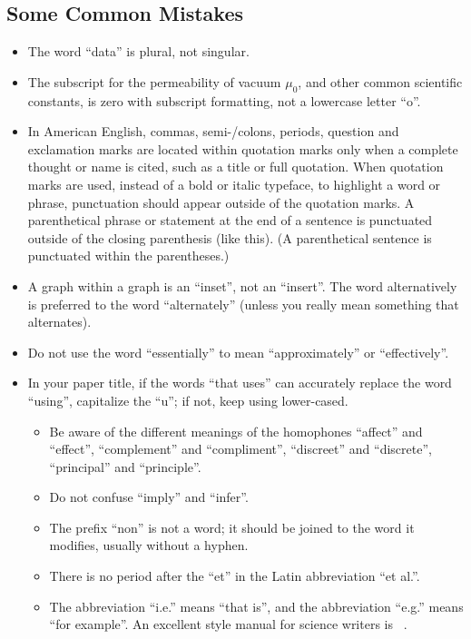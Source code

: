 \documentclass[conference, letterpaper]{IEEEtran}
\begin{document}
\subsection{Some Common Mistakes}
\begin{itemize}
\item The word “data” is plural, not singular.
\item The subscript for the permeability of vacuum $\mu_0$, and other common scientific constants, is zero with subscript formatting, not a lowercase letter “o”.
\item In American English, commas, semi-/colons, periods, question and exclamation marks are located within quotation marks only when a complete thought or name is cited, such as a title or full quotation. When quotation marks are used, instead of a bold or italic typeface, to highlight a word or phrase, punctuation should appear outside of the quotation marks. A parenthetical phrase or statement at the end of a sentence is punctuated outside of the closing parenthesis (like this). (A parenthetical sentence is punctuated within the parentheses.)
\item A graph within a graph is an “inset”, not an “insert”. The word alternatively is preferred to the word “alternately” (unless you really mean something that alternates).
\item Do not use the word “essentially” to mean “approximately” or “effectively”.
\item In your paper title, if the words “that uses” can accurately replace the word “using”, capitalize the “u”; if not, keep using lower-cased.\\
\begin{itemize}
\item Be aware of the different meanings of the homophones “affect” and “effect”, “complement” and “compliment”, “discreet” and “discrete”, “principal” and “principle”.\\
\item Do not confuse “imply” and “infer”.\\
\item The prefix “non” is not a word; it should be joined to the word it modifies, usually without a hyphen.\\
\item There is no period after the “et” in the Latin abbreviation “et al.”.\\
\item The abbreviation “i.e.” means “that is”, and the abbreviation “e.g.” means “for example”. An excellent style manual for science writers is ~\cite{young1989}.
\end{itemize}
\end{itemize}
\end{document}
